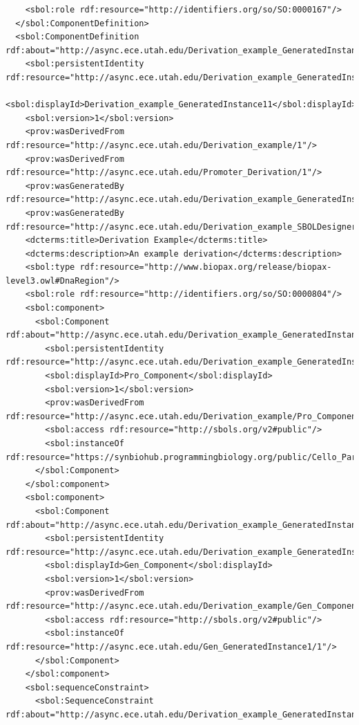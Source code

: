 \begin{lstlisting}
    <sbol:role rdf:resource="http://identifiers.org/so/SO:0000167"/>
  </sbol:ComponentDefinition>
  <sbol:ComponentDefinition rdf:about="http://async.ece.utah.edu/Derivation_example_GeneratedInstance11/1">
    <sbol:persistentIdentity rdf:resource="http://async.ece.utah.edu/Derivation_example_GeneratedInstance11"/>
    <sbol:displayId>Derivation_example_GeneratedInstance11</sbol:displayId>
    <sbol:version>1</sbol:version>
    <prov:wasDerivedFrom rdf:resource="http://async.ece.utah.edu/Derivation_example/1"/>
    <prov:wasDerivedFrom rdf:resource="http://async.ece.utah.edu/Promoter_Derivation/1"/>
    <prov:wasGeneratedBy rdf:resource="http://async.ece.utah.edu/Derivation_example_GeneratedInstance21_SBOLDesignerActivity/1"/>
    <prov:wasGeneratedBy rdf:resource="http://async.ece.utah.edu/Derivation_example_SBOLDesignerActivity/1"/>
    <dcterms:title>Derivation Example</dcterms:title>
    <dcterms:description>An example derivation</dcterms:description>
    <sbol:type rdf:resource="http://www.biopax.org/release/biopax-level3.owl#DnaRegion"/>
    <sbol:role rdf:resource="http://identifiers.org/so/SO:0000804"/>
    <sbol:component>
      <sbol:Component rdf:about="http://async.ece.utah.edu/Derivation_example_GeneratedInstance11/Pro_Component/1">
        <sbol:persistentIdentity rdf:resource="http://async.ece.utah.edu/Derivation_example_GeneratedInstance11/Pro_Component"/>
        <sbol:displayId>Pro_Component</sbol:displayId>
        <sbol:version>1</sbol:version>
        <prov:wasDerivedFrom rdf:resource="http://async.ece.utah.edu/Derivation_example/Pro_Component/1"/>
        <sbol:access rdf:resource="http://sbols.org/v2#public"/>
        <sbol:instanceOf rdf:resource="https://synbiohub.programmingbiology.org/public/Cello_Parts/pAmtR/1"/>
      </sbol:Component>
    </sbol:component>
    <sbol:component>
      <sbol:Component rdf:about="http://async.ece.utah.edu/Derivation_example_GeneratedInstance11/Gen_Component/1">
        <sbol:persistentIdentity rdf:resource="http://async.ece.utah.edu/Derivation_example_GeneratedInstance11/Gen_Component"/>
        <sbol:displayId>Gen_Component</sbol:displayId>
        <sbol:version>1</sbol:version>
        <prov:wasDerivedFrom rdf:resource="http://async.ece.utah.edu/Derivation_example/Gen_Component/1"/>
        <sbol:access rdf:resource="http://sbols.org/v2#public"/>
        <sbol:instanceOf rdf:resource="http://async.ece.utah.edu/Gen_GeneratedInstance1/1"/>
      </sbol:Component>
    </sbol:component>
    <sbol:sequenceConstraint>
      <sbol:SequenceConstraint rdf:about="http://async.ece.utah.edu/Derivation_example_GeneratedInstance11/Derivation_example_SequenceConstraint/1">

\end{lstlisting}
